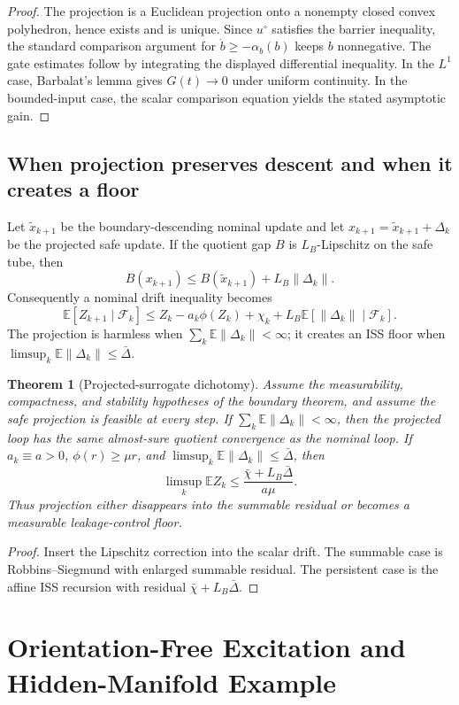 \documentclass[11pt]{article}
\theoremstyle{definition}
\theoremstyle{plain}
\newtheorem{theorem}[definition]{Theorem}
\theoremstyle{remark}
\newcommand{\E}{\mathbb{E}}
\newcommand{\cF}{\mathcal{F}}
\begin{document}
\begin{proof}
The projection is a Euclidean projection onto a nonempty closed convex polyhedron, hence exists and is unique. Since $u^\circ$ satisfies the barrier inequality, the standard comparison argument for $\dot b\ge-\alpha_b(b)$ keeps $b$ nonnegative. The gate estimates follow by integrating the displayed differential inequality. In the $L^1$ case, Barbalat's lemma gives $G(t)\to0$ under uniform continuity. In the bounded-input case, the scalar comparison equation yields the stated asymptotic gain.
\end{proof}


\subsection{When projection preserves descent and when it creates a floor}

Let $\tilde x_{k+1}$ be the boundary-descending nominal update and let $x_{k+1}=\tilde x_{k+1}+\Delta_k$ be the projected safe update. If the quotient gap $B$ is $L_B$-Lipschitz on the safe tube, then
\[
B(x_{k+1})\le B(\tilde x_{k+1})+L_B\|\Delta_k\|.
\]
Consequently a nominal drift inequality becomes
\[
\E[Z_{k+1}\mid\cF_k]\le Z_k-a_k\phi(Z_k)+\chi_k+L_B\E[\|\Delta_k\|\mid\cF_k].
\]
The projection is harmless when $\sum_k\E\|\Delta_k\|<\infty$; it creates an ISS floor when $\limsup_k\E\|\Delta_k\|\le \bar\Delta$.

\begin{theorem}[Projected-surrogate dichotomy]
Assume the measurability, compactness, and stability hypotheses of the boundary theorem, and assume the safe projection is feasible at every step. If $\sum_k\E\|\Delta_k\|<\infty$, then the projected loop has the same almost-sure quotient convergence as the nominal loop. If $a_k\equiv a>0$, $\phi(r)\ge\mu r$, and $\limsup_k\E\|\Delta_k\|\le\bar\Delta$, then
\[
\limsup_k \E Z_k\le \frac{\bar\chi+L_B\bar\Delta}{a\mu}.
\]
Thus projection either disappears into the summable residual or becomes a measurable leakage-control floor.
\end{theorem}

\begin{proof}
Insert the Lipschitz correction into the scalar drift. The summable case is Robbins--Siegmund with enlarged summable residual. The persistent case is the affine ISS recursion with residual $\bar\chi+L_B\bar\Delta$.
\end{proof}

\section{Orientation-Free Excitation and Hidden-Manifold Example}
\end{document}
